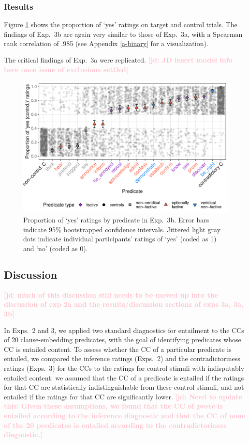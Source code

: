 \documentclass[11pt,fleqn]{article}
\newcommand{\jd}[1]{\textbf{\textcolor{Pink}{[jd: #1]}}}
\newcommand{\6}{\mbox{$[\hspace*{-.6mm}[$}}
\newcommand{\9}{\mbox{$]\hspace*{-.6mm}]$}}
\begin{document}
{\subsubsection{Results}

Figure \ref{fig:3bresults} shows the proportion of `yes' ratings on target and control trials. The findings of Exp.~3b are again very similar to those of Exp.~3a, with a Spearman rank correlation of .985 (see Appendix \ref{a-binary} for a visualization).

The critical findings of Exp.~3a were replicated.  \jd{JD insert model info here once issue of exclusions settled} 

\begin{figure}
\centering
\includegraphics[width=.7\paperwidth]{../../results/6-veridicality2-binary/graphs/proportion-by-predicate-variability-individual}
\caption{Proportion of `yes' ratings by predicate in Exp.~3b. Error bars indicate 95\% bootstrapped confidence intervals. Jittered light gray dots indicate individual participants' ratings of `yes' (coded as 1) and `no' (coded as 0). }
\label{fig:3bresults}
\end{figure}

\subsection{Discussion}\label{s33}

\jd{much of this discussion still needs to be moved up into the discussion of exp 2a and the results/discussion sections of exps 3a, 3a, 3b}

In Exps.~2 and 3, we applied two standard diagnostics for entailment to the CCs of 20 clause-embedding predicates, with the goal of identifying predicates whose CC is entailed content. To assess whether the CC of a particular predicate is entailed, we compared the inference ratings (Exps.~2) and the contradictoriness ratings (Exps.~3) for the CCs to the ratings for control stimuli with indisputably entailed content: we assumed that the CC of a predicate is entailed if the ratings for that CC are statistically indistinguishable from these control stimuli, and not entailed if the ratings for that CC are significantly lower. \jd{Need to update this: Given these assumptions, we found that the CC of {\em prove} is entailed according to the inference diagnostic and that the CC of none of the 20 predicates is entailed according to the contradictoriness diagnostic.}

}
\end{document}

